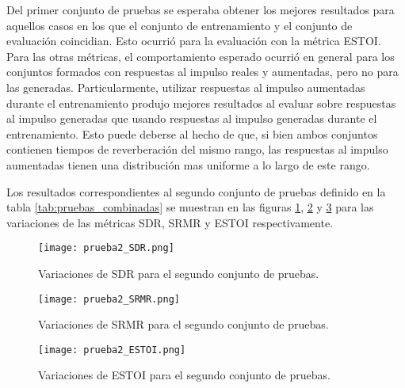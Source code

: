 Del primer conjunto de pruebas se esperaba obtener los mejores resultados para aquellos casos en los que el conjunto de entrenamiento y el conjunto de evaluación coincidian. Esto ocurrió para la evaluación con la métrica ESTOI. Para las otras métricas, el comportamiento esperado ocurrió en general para los conjuntos formados con respuestas al impulso reales y aumentadas, pero no para las generadas. Particularmente, utilizar respuestas al impulso aumentadas durante el entrenamiento produjo mejores resultados al evaluar sobre respuestas al impulso generadas que usando respuestas al impulso generadas durante el entrenamiento. Esto puede deberse al hecho de que, si bien ambos conjuntos contienen tiempos de reverberación del mismo rango, las respuestas al impulso aumentadas tienen una distribución mas uniforme a lo largo de este rango.

Los resultados correspondientes al segundo conjunto de pruebas definido en la tabla \ref{tab:pruebas_combinadas} se muestran en las figuras \ref{fig:2_SDR}, \ref{fig:2_SRMR} y \ref{fig:2_ESTOI} para las variaciones de las métricas SDR, SRMR y ESTOI respectivamente.

\begin{figure}[H]
	\centering{}
	\texttt{[image: prueba2\_SDR.png]}
	\caption{Variaciones de SDR para el segundo conjunto de pruebas.}
	\label{fig:2_SDR}
\end{figure}

\begin{figure}[H]
	\centering{}
	\texttt{[image: prueba2\_SRMR.png]}
	\caption{Variaciones de SRMR para el segundo conjunto de pruebas.}
	\label{fig:2_SRMR}
\end{figure}

\begin{figure}[H]
	\centering{}
	\texttt{[image: prueba2\_ESTOI.png]}
	\caption{Variaciones de ESTOI para el segundo conjunto de pruebas.}
	\label{fig:2_ESTOI}
\end{figure}

